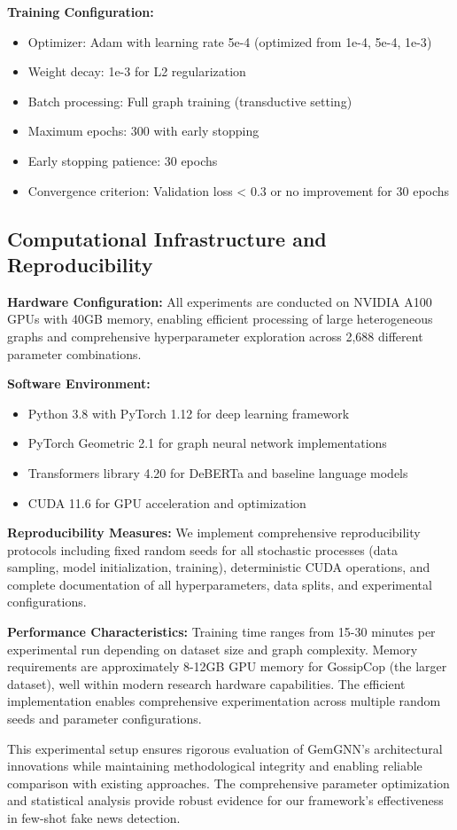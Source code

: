 \textbf{Training Configuration:}
\begin{itemize}
\item Optimizer: Adam with learning rate 5e-4 (optimized from {1e-4, 5e-4, 1e-3})
\item Weight decay: 1e-3 for L2 regularization
\item Batch processing: Full graph training (transductive setting)
\item Maximum epochs: 300 with early stopping
\item Early stopping patience: 30 epochs
\item Convergence criterion: Validation loss < 0.3 or no improvement for 30 epochs
\end{itemize}

\subsection{Computational Infrastructure and Reproducibility}

\textbf{Hardware Configuration:} All experiments are conducted on NVIDIA A100 GPUs with 40GB memory, enabling efficient processing of large heterogeneous graphs and comprehensive hyperparameter exploration across 2,688 different parameter combinations.

\textbf{Software Environment:}
\begin{itemize}
\item Python 3.8 with PyTorch 1.12 for deep learning framework
\item PyTorch Geometric 2.1 for graph neural network implementations
\item Transformers library 4.20 for DeBERTa and baseline language models
\item CUDA 11.6 for GPU acceleration and optimization
\end{itemize}

\textbf{Reproducibility Measures:} We implement comprehensive reproducibility protocols including fixed random seeds for all stochastic processes (data sampling, model initialization, training), deterministic CUDA operations, and complete documentation of all hyperparameters, data splits, and experimental configurations.

\textbf{Performance Characteristics:} Training time ranges from 15-30 minutes per experimental run depending on dataset size and graph complexity. Memory requirements are approximately 8-12GB GPU memory for GossipCop (the larger dataset), well within modern research hardware capabilities. The efficient implementation enables comprehensive experimentation across multiple random seeds and parameter configurations.

This experimental setup ensures rigorous evaluation of GemGNN's architectural innovations while maintaining methodological integrity and enabling reliable comparison with existing approaches. The comprehensive parameter optimization and statistical analysis provide robust evidence for our framework's effectiveness in few-shot fake news detection.

\EndChapter
